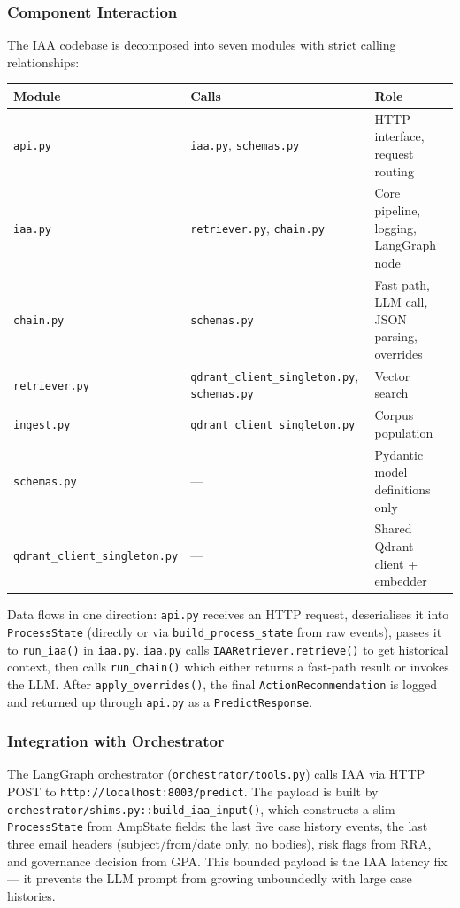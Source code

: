 \documentclass[12pt,a4paper]{article}
\begin{document}
\subsubsection{Component Interaction}

The IAA codebase is decomposed into seven modules with strict calling relationships:

\begin{center}
\begin{tabular}{@{}lll@{}}
\toprule
\textbf{Module} & \textbf{Calls} & \textbf{Role} \\
\midrule
\texttt{api.py} & \texttt{iaa.py}, \texttt{schemas.py} & HTTP interface, request routing \\
\texttt{iaa.py} & \texttt{retriever.py}, \texttt{chain.py} & Core pipeline, logging, LangGraph node \\
\texttt{chain.py} & \texttt{schemas.py} & Fast path, LLM call, JSON parsing, overrides \\
\texttt{retriever.py} & \texttt{qdrant\_client\_singleton.py}, \texttt{schemas.py} & Vector search \\
\texttt{ingest.py} & \texttt{qdrant\_client\_singleton.py} & Corpus population \\
\texttt{schemas.py} & --- & Pydantic model definitions only \\
\texttt{qdrant\_client\_singleton.py} & --- & Shared Qdrant client + embedder \\
\bottomrule
\end{tabular}
\end{center}

Data flows in one direction: \texttt{api.py} receives an HTTP request, deserialises it
into \texttt{ProcessState} (directly or via \texttt{build\_process\_state} from raw events),
passes it to \texttt{run\_iaa()} in \texttt{iaa.py}. \texttt{iaa.py} calls
\texttt{IAARetriever.retrieve()} to get historical context, then calls
\texttt{run\_chain()} which either returns a fast-path result or invokes the LLM.
After \texttt{apply\_overrides()}, the final \texttt{ActionRecommendation} is logged
and returned up through \texttt{api.py} as a \texttt{PredictResponse}.

\subsubsection{Integration with Orchestrator}

The LangGraph orchestrator (\texttt{orchestrator/tools.py}) calls IAA via HTTP POST to
\texttt{http://localhost:8003/predict}. The payload is built by
\texttt{orchestrator/shims.py::build\_iaa\_input()}, which constructs a slim
\texttt{ProcessState} from AmpState fields: the last five case history events,
the last three email headers (subject/from/date only, no bodies), risk flags from RRA,
and governance decision from GPA. This bounded payload is the IAA latency fix --- it
prevents the LLM prompt from growing unboundedly with large case histories.
\end{document}
